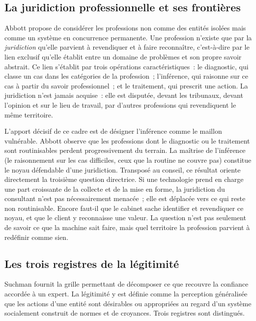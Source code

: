 \subsection{La juridiction professionnelle et ses frontières}

Abbott \cite{abbott1988} propose de considérer les professions non comme des entités
isolées mais comme un système en concurrence permanente. Une profession n'existe que par la
\textit{juridiction} qu'elle parvient à revendiquer et à faire reconnaître, c'est-à-dire par
le lien exclusif qu'elle établit entre un domaine de problèmes et son propre savoir
abstrait. Ce lien s'établit par trois opérations caractéristiques~: le diagnostic, qui
classe un cas dans les catégories de la profession~; l'inférence, qui raisonne sur ce cas à
partir du savoir professionnel~; et le traitement, qui prescrit une action. La juridiction
n'est jamais acquise~: elle est disputée, devant les tribunaux, devant l'opinion et sur le
lieu de travail, par d'autres professions qui revendiquent le même territoire.

L'apport décisif de ce cadre est de désigner l'inférence comme le maillon vulnérable.
Abbott observe que les professions dont le diagnostic ou le traitement sont routinisables
perdent progressivement du terrain. La maîtrise de l'inférence (le raisonnement sur les cas
difficiles, ceux que la routine ne couvre pas) constitue le noyau défendable d'une
juridiction. Transposé au conseil, ce résultat oriente directement la troisième
question directrice. Si une technologie prend en charge une part croissante de la collecte
et de la mise en forme, la juridiction du consultant n'est pas nécessairement menacée~; elle
est déplacée vers ce qui reste non routinisable. Encore faut-il que le cabinet sache
identifier et revendiquer ce noyau, et que le client y reconnaisse une valeur. La question
n'est pas seulement de savoir ce que la machine sait faire, mais quel territoire la
profession parvient à redéfinir comme sien.

\subsection{Les trois registres de la légitimité}

Suchman \cite{suchman1995} fournit la grille permettant de décomposer ce que recouvre la
confiance accordée à un expert. La légitimité y est définie comme la perception
généralisée que les actions d'une entité sont désirables ou appropriées au regard d'un
système socialement construit de normes et de croyances. Trois registres sont distingués.

